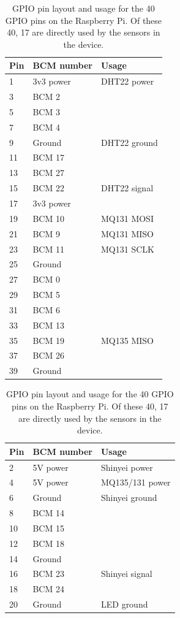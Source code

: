 \documentclass[11pt]{report}
\begin{document}
\begin{table}[!tb]
  \centering
  \caption{GPIO pin layout and usage for the 40 GPIO pins on the Raspberry Pi. Of these 40, 17 are directly used by the sensors in the device.}
  \label{gpio}
  \begin{tabular}{ l l l }
  \toprule
  Pin & BCM number & Usage \\ \midrule
  1 & 3v3 power & DHT22 power  \\
  3 & BCM 2 &  \\
  5 & BCM 3 &  \\
  7 & BCM 4 &  \\
  9 & Ground & DHT22 ground  \\
  11 & BCM 17 &  \\
  13 & BCM 27 &  \\
  15 & BCM 22 & DHT22 signal  \\
  17 & 3v3 power &  \\
  19 & BCM 10 & MQ131 MOSI \\
  21 & BCM 9 & MQ131 MISO \\
  23 & BCM 11 & MQ131 SCLK \\
  25 & Ground &  \\
  27 & BCM 0 &  \\
  29 & BCM 5 &  \\
  31 & BCM 6 &  \\
  33 & BCM 13 &  \\
  35 & BCM 19 & MQ135 MISO \\
  37 & BCM 26 &  \\
  39 & Ground &  \\ \bottomrule
  \end{tabular}
  \hspace{0.5em}
  \begin{tabular}{ l l l }
  \toprule
  Pin & BCM number & Usage \\ \midrule
  2 & 5V power & Shinyei power \\
  4 & 5V power & MQ135/131 power \\
  6 & Ground & Shinyei ground  \\
  8 & BCM 14 &  \\
  10 & BCM 15 &  \\
  12 & BCM 18 &  \\
  14 & Ground &  \\
  16 & BCM 23 & Shinyei signal \\
  18 & BCM 24 & \\
  20 & Ground & LED ground \\

\end{tabular}
\end{table}
\end{document}
